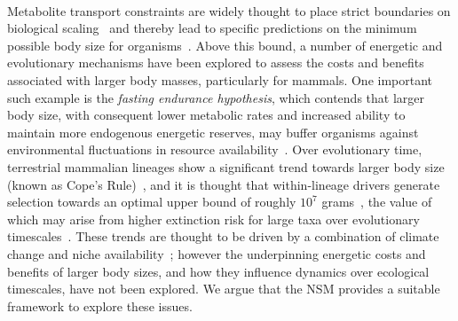 \documentclass{pnastwo}
\begin{document}
\begin{article}
 \\
Metabolite transport constraints are widely thought to place strict
boundaries on biological
scaling~\cite{Brown:1993p708,West:1997cg,Brown:2004wq} and thereby lead to
specific predictions on the minimum possible body size for
organisms~\cite{West:2002ud}.  Above this bound, a number of energetic and
evolutionary mechanisms have been explored to assess the costs and benefits
associated with larger body masses, particularly for mammals.  One important
such example is the \emph{fasting endurance hypothesis}, which contends that
larger body size, with consequent lower metabolic rates and increased ability
to maintain more endogenous energetic reserves, may buffer organisms against
environmental fluctuations in resource availability~\cite{Millar:1990p923}.
Over evolutionary time, terrestrial mammalian lineages show a significant
trend towards larger body size (known as Cope's
Rule)~\cite{Alroy:1998p1594,Clauset:2009fh,Smith:2010p3442,Saarinen:2014br},
and it is thought that within-lineage drivers generate selection towards an
optimal upper bound of roughly $10^7$ grams~\cite{Alroy:1998p1594}, the value
of which may arise from higher extinction risk for large taxa over
evolutionary timescales~\cite{Clauset:2009fh}.  These trends are thought to
be driven by a combination of climate change and niche
availability~\cite{Saarinen:2014br}; however the underpinning energetic costs
and benefits of larger body sizes, and how they influence dynamics over
ecological timescales, have not been explored.  We argue that the NSM
provides a suitable framework to explore these issues.


\end{article}
\end{document}
